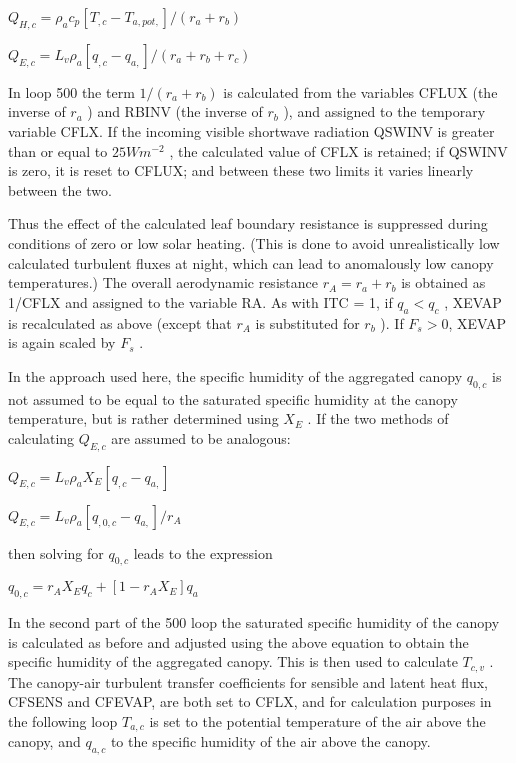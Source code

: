 $Q_{H,c} = \rho_a c_p [T_{,c} - T_{a,pot,} ]/(r_a + r_b )$

$Q_{E,c} = L_v \rho_a [q_{,c} - q_{a,} ]/(r_a + r_b + r_c )$

In loop 500 the term $1/(r_a + r_b )$ is calculated from the variables C\+F\+L\+U\+X (the inverse of $r_a$ ) and R\+B\+I\+N\+V (the inverse of $r_b$ ), and assigned to the temporary variable C\+F\+L\+X. If the incoming visible shortwave radiation Q\+S\+W\+I\+N\+V is greater than or equal to $25 W m^{-2}$ , the calculated value of C\+F\+L\+X is retained; if Q\+S\+W\+I\+N\+V is zero, it is reset to C\+F\+L\+U\+X; and between these two limits it varies linearly between the two.

Thus the effect of the calculated leaf boundary resistance is suppressed during conditions of zero or low solar heating. (This is done to avoid unrealistically low calculated turbulent fluxes at night, which can lead to anomalously low canopy temperatures.) The overall aerodynamic resistance $r_A = r_a + r_b$ is obtained as 1/\+C\+F\+L\+X and assigned to the variable R\+A. As with I\+T\+C = 1, if $q_a < q_c$ , X\+E\+V\+A\+P is recalculated as above (except that $r_A$ is substituted for $r_b$ ). If $F_s > 0$, X\+E\+V\+A\+P is again scaled by $F_s$ .

In the approach used here, the specific humidity of the aggregated canopy $q_{0,c}$ is not assumed to be equal to the saturated specific humidity at the canopy temperature, but is rather determined using $X_E$ . If the two methods of calculating $Q_{E,c}$ are assumed to be analogous\+:

$Q_{E,c} = L_v \rho_a X_E [q_{,c} - q_{a,} ]$

$Q_{E,c} = L_v \rho_a [q_{,0,c} - q_{a,} ]/r_A$

then solving for $q_{0,c}$ leads to the expression

$q_{0,c} = r_A X_E q_c + [1 - r_A X_E ]q_a$

In the second part of the 500 loop the saturated specific humidity of the canopy is calculated as before and adjusted using the above equation to obtain the specific humidity of the aggregated canopy. This is then used to calculate $T_{c,v}$ . The canopy-\/air turbulent transfer coefficients for sensible and latent heat flux, C\+F\+S\+E\+N\+S and C\+F\+E\+V\+A\+P, are both set to C\+F\+L\+X, and for calculation purposes in the following loop $T_{a,c}$ is set to the potential temperature of the air above the canopy, and $q_{a,c}$ to the specific humidity of the air above the canopy.

